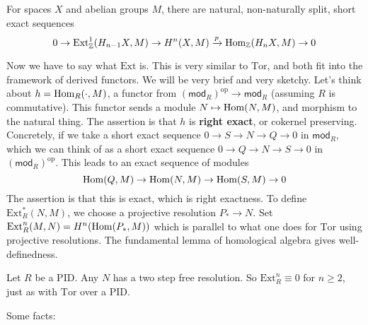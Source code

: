 \begin{cor}
    For spaces $X$ and abelian groups $M$, there are natural, non-naturally split, short exact sequences 
    \[
        0 \to \mathrm{Ext}^1 _{\mathbb{Z}}(H_{n-1}X,M) \to H^n (X,M) \xrightarrow p \operatorname{Hom}_{\mathbb{Z}}(H_n X,M)\to 0
    \] 
\end{cor}
Now we have to say what $\mathrm{Ext}$ is. This is very similar to $\mathrm{Tor}$, and both fit into the framework of derived functors. We will be very brief and very sketchy. Let's think about $h =\operatorname{Hom}_R(\cdot ,M)$, a functor from $\left( \mathsf{mod} _R \right)^{\mathrm{op}}  \to  \mathsf{mod} _R$ (assuming $R$ is commutative). This functor sends a module $N \mapsto  \operatorname{Hom}(N,M)$, and morphism to the natural thing. The assertion is that $h$ is \textbf{right exact}, or cokernel preserving. 
Concretely, if we take a short exact sequence $0 \to S \to  N \to Q \to 0$ in $\mathsf{mod} _R$, which we can think of as a short exact sequence $0 \to Q \to N \to S \to 0$ in $\left( \mathsf{mod} _R \right) ^{\mathrm{op}}$. This leads to an exact sequence of modules \[
    \operatorname{Hom}(Q,M) \to \operatorname{Hom}(N,M) \to \operatorname{Hom}(S,M) \to 0
\] The assertion is that this is exact, which is right exactness. To define $\mathrm{Ext}_R^*(N,M)$, we choose a projective resolution $P_* \to N$. Set $\mathrm{Ext}^n _R(M,N)=H^n (\operatorname{Hom}(P_* ,M))$ which is parallel to what one does for $\mathrm{Tor}$ using projective resolutions. The fundamental lemma of homological algebra gives well-definedness. 
    \begin{example}
        Let $R$ be a PID. Any $N$ has a two step free resolution. So $\mathrm{Ext}^n _R \equiv 0 $ for $n \geq 2$, just as with $\mathrm{Tor}$ over a PID.
    \end{example}
    Some facts:
